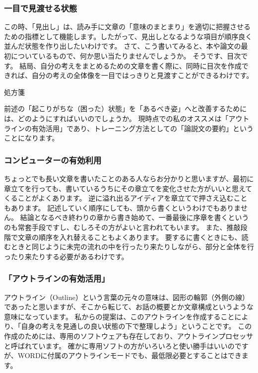\documentclass[12pt,a4paper]{jsarticle}
\makeatletter
\def\subsection{\@startsection 
{subsection}
{1}
{\z@}
{3.5ex plus -1ex minus -.2ex}
{1.ex plus .2ex}
{\large\bf}
}
\makeatother
\begin{document}
\subsubsection{一目で見渡せる状態}

この時、「見出し」は、読み手に文章の「意味のまとまり」を適切に把握させるための指標として機能します。したがって、見出しとなるような項目が順序良く並んだ状態を作り出したいわけです。
さて、こう書いてみると、本や論文の最初についているもので、何か思い当たりませんでしょうか。
そうです、目次です。
結局、自分の考えをまとめるための文章を書く際に、同時に目次を作成できれば、自分の考えの全体像を一目ではっきりと見渡すことができるわけです。

\subsection{処方箋}

前述の「起こりがちな（困った）状態」を「あるべき姿」へと改善するためには、どのようにすればいいのでしょうか。
現時点での私のオススメは「アウトラインの有効活用」であり、トレーニング方法としての「論説文の要約」ということになります。

\subsubsection{コンピューターの有効利用}

ちょっとでも長い文章を書いたことのある人ならお分かりと思いますが、最初に章立てを行っても、書いているうちにその章立てを変化させた方がいいと思えてくることがよくあります。
逆に溢れ出るアイディアを章立てで押さえ込むこともあります。
記述していく順序にしても、頭から書くというわけでもありません。
結論となるべき終わりの章から書き始めて、一番最後に序章を書くというのも常套手段ですし、むしろその方がよいと言われてもいます。
また、推敲段階で文章の順序を入れ替えることもよくあります。
要するに書くときにも、読むときと同じように未完の流れの中を行ったり来たりしながら、部分と全体を行ったり来たりする必要があるわけです。

\subsubsection{「アウトラインの有効活用」}

アウトライン（Outline）という言葉の元々の意味は、図形の輪郭（外側の線）であったと思いますが、そこから転じて、お話の概要とか文章構成というような意味になっています。
私からの提案は、このアウトラインを作成することにより、「自身の考えを見通しの良い状態の下で整理しよう」ということです。
この作成のためには、専用のソフトウェアも存在しており、アウトラインプロセッサと呼ばれています。
確かに専用ソフトの方がいろいろと使い勝手はいいのですが、WORDに付属のアウトラインモードでも、最低限必要とすることはできます。
\end{document}
